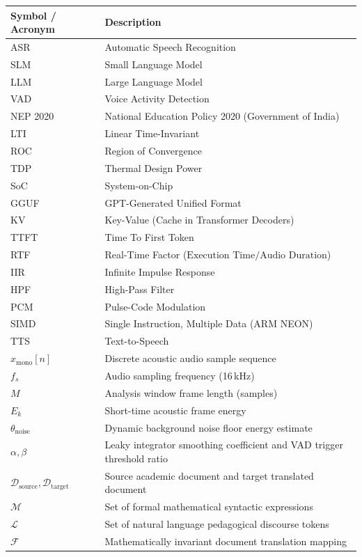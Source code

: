 \documentclass[11pt,a4paper,oneside]{report}
\begin{document}
\begin{table}[htbp]
\centering
\begin{tabularx}{\textwidth}{lX}
\toprule
\textbf{Symbol / Acronym} & \textbf{Description} \\
\midrule
ASR & Automatic Speech Recognition \\
SLM & Small Language Model \\
LLM & Large Language Model \\
VAD & Voice Activity Detection \\
NEP 2020 & National Education Policy 2020 (Government of India) \\
LTI & Linear Time-Invariant \\
ROC & Region of Convergence \\
TDP & Thermal Design Power \\
SoC & System-on-Chip \\
GGUF & GPT-Generated Unified Format \\
KV & Key-Value (Cache in Transformer Decoders) \\
TTFT & Time To First Token \\
RTF & Real-Time Factor ($\text{Execution Time} / \text{Audio Duration}$) \\
IIR & Infinite Impulse Response \\
HPF & High-Pass Filter \\
PCM & Pulse-Code Modulation \\
SIMD & Single Instruction, Multiple Data (ARM NEON) \\
TTS & Text-to-Speech \\
$x_{\text{mono}}[n]$ & Discrete acoustic audio sample sequence \\
$f_s$ & Audio sampling frequency (16\,kHz) \\
$M$ & Analysis window frame length (samples) \\
$E_k$ & Short-time acoustic frame energy \\
$\theta_{\text{noise}}$ & Dynamic background noise floor energy estimate \\
$\alpha, \beta$ & Leaky integrator smoothing coefficient and VAD trigger threshold ratio \\
$\mathcal{D}_{\text{source}}, \mathcal{D}_{\text{target}}$ & Source academic document and target translated document \\
$\mathcal{M}$ & Set of formal mathematical syntactic expressions \\
$\mathcal{L}$ & Set of natural language pedagogical discourse tokens \\
$\mathcal{F}$ & Mathematically invariant document translation mapping \\
\bottomrule
\end{tabularx}
\end{table}
\end{document}
